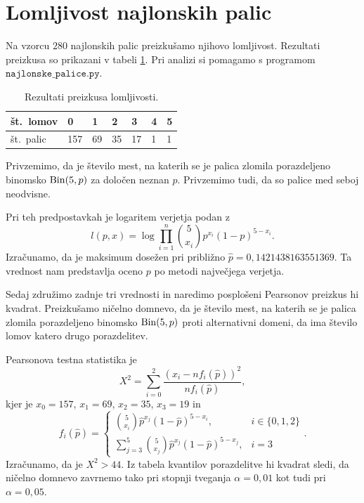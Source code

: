 \documentclass[12pt, a4paper]{article}
\begin{document}
\section{Lomljivost najlonskih palic}
Na vzorcu $280$ najlonskih palic preizkušamo njihovo lomljivost. Rezultati 
preizkusa so prikazani v tabeli \ref{table:lomljivost}. Pri analizi 
si pomagamo s programom $\texttt{najlonske\_palice.py}$.
\begin{table}[H]
    \centering
    \begin{tabular}{|l||l|l|l|l|l|l|}
        \hline
        št.~lomov & 0   & 1  & 2  & 3  & 4 & 5 \\ \hline
        št.~palic & 157 & 69 & 35 & 17 & 1 & 1 \\ \hline
    \end{tabular}
    \caption{Rezultati preizkusa lomljivosti.}
    \label{table:lomljivost}
\end{table}
Privzemimo, da je število mest, na katerih se je palica 
zlomila porazdeljeno binomsko $\operatorname{Bin}(5, p)$ za določen neznan $p$.
Privzemimo tudi, da so palice med seboj neodvisne.


Pri teh predpostavkah je logaritem verjetja podan z
\[
    l(p, x) = \log\prod_{i=1}^n \binom{5}{x_i}p^{x_i}(1-p)^{5-x_i}.
\]
Izračunamo, da je maksimum 
dosežen pri približno $\hat p = 0{,}1421438163551369$. Ta vrednost
nam predstavlja oceno $p$ po metodi največjega verjetja.


Sedaj združimo zadnje tri vrednosti in naredimo posplošeni 
Pearsonov preizkus hi kvadrat. Preizkušamo ničelno domnevo, da 
je število mest, na katerih se je palica zlomila porazdeljeno 
binomsko $\operatorname{Bin}(5, p)$ proti alternativni domeni, da ima število 
lomov katero drugo porazdelitev.

Pearsonova testna statistika je
\[
    X^2 = \sum_{i=0}^{2}\frac{(x_i - nf_i(\hat p))^2}{nf_i(\hat p)},
\]
kjer je $x_0 = 157$, $x_1 = 69$, $x_2 = 35$, $x_3 = 19$ in
\[
    f_i(\hat p) = \begin{cases}
        \binom{5}{x_i}\hat p^{x_j}(1-\hat p)^{5-x_i}, &i \in \{0,1,2\} \\
        \sum_{j=3}^{5} \binom{5}{x_j}\hat p^{x_j}(1-\hat p)^{5-x_j}, &i = 3 
    \end{cases}.
\]
Izračunamo, da je $X^2 > 44$. Iz tabela kvantilov porazdelitve 
hi kvadrat sledi, da ničelno domnevo zavrnemo tako 
pri stopnji tveganja $\alpha = 0{,}01$ kot tudi pri $\alpha = 0{,}05$. 

\end{document}
